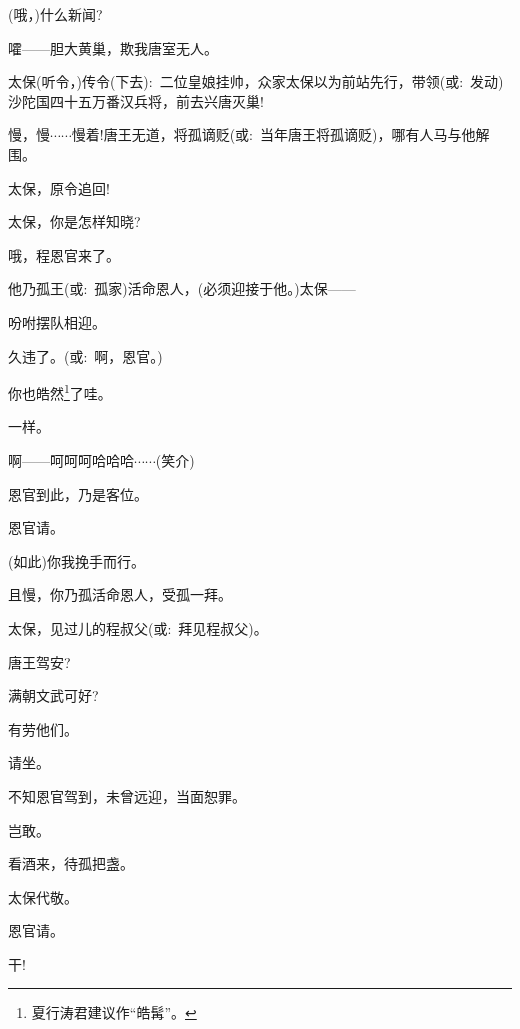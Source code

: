 {(哦，)什么新闻?

嚯------胆大黄巢，欺我唐室无人。

太保(听令，)传令(下去):~二位皇娘挂帅，众家太保以为前站先行，带领({\akai 或}:~发动)沙陀国四十五万番汉兵将，前去兴唐灭巢!

慢，慢$\cdots{}\cdots{}$慢着!唐王无道，将孤谪贬({\akai 或}:~当年唐王将孤谪贬)，哪有人马与他解围。

太保，原令追回!

太保，你是怎样知晓?

哦，程恩官来了。

他乃孤王({\akai 或}:~孤家)活命恩人，(必须迎接于他。)太保------

吩咐摆队相迎。

\vspace{5pt}

久违了。({\akai 或}:~啊，恩官。)

你也皓然\footnote{夏行涛君建议作``皓髯''。}了哇。

一样。\hspace{20pt}~

啊------呵呵呵哈哈哈$\cdots{}\cdots{}$({\hwfs 笑}{\hwfs 介})

恩官到此，乃是客位。

恩官请。\hspace{10pt}~

(如此)你我挽手而行。

\vspace{5pt}

且慢，你乃孤活命恩人，受孤一拜。

太保，见过儿的程叔父({\akai 或}:~拜见程叔父)。

唐王驾安?\hspace{10pt}~

满朝文武可好?

有劳他们。

请坐。\hspace{20pt}~

不知恩官驾到，未曾远迎，当面恕罪。

岂敢。\hspace{20pt}~

看酒来，待孤把盏。

太保代敬。

恩官请。\hspace{10pt}~

干!\hspace{40pt}~

}
